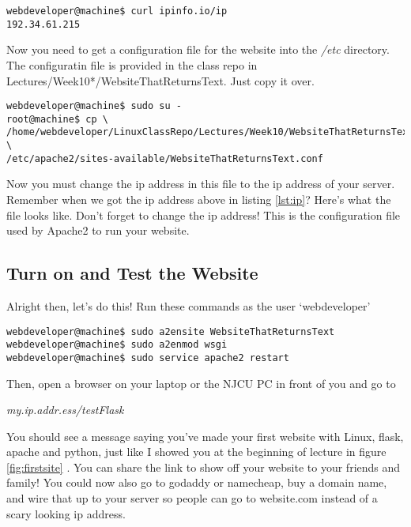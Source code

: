 \documentclass[10pt]{article}
\begin{document}
\begin{lstlisting}[style=term, caption=Run this command to get your server's ip
address., label=lst:ip]
webdeveloper@machine$ curl ipinfo.io/ip
192.34.61.215
\end{lstlisting}

Now you need to get a configuration file for the website into the \textit{/etc}
directory. The configuratin file is provided in the class repo in
Lectures/Week10*/WebsiteThatReturnsText. Just copy it over.

\begin{lstlisting}[style=term, caption=Get the configuration file]
webdeveloper@machine$ sudo su -
root@machine$ cp \
/home/webdeveloper/LinuxClassRepo/Lectures/Week10/WebsiteThatReturnsText/WebsiteThatReturnsText.conf \
/etc/apache2/sites-available/WebsiteThatReturnsText.conf
\end{lstlisting}

Now you must change the ip address in this file to the ip address of your
server. Remember when we got the ip address above in listing \ref{lst:ip}?
Here's what the file looks like. Don't forget to change the ip address! This is
the configuration file used by Apache2 to run your website.



\subsection{Turn on and Test the Website}
Alright then, let's do this! Run these commands as the user `webdeveloper'
\begin{lstlisting}[style=term]
webdeveloper@machine$ sudo a2ensite WebsiteThatReturnsText 
webdeveloper@machine$ sudo a2enmod wsgi
webdeveloper@machine$ sudo service apache2 restart
\end{lstlisting}

Then, open a browser on your laptop or the NJCU PC in front of you and go to 

\begin{center}
\textit{my.ip.addr.ess/testFlask}
\end{center}

You should see a message saying you've made your first website with Linux,
flask, apache and python, just like I showed you at the beginning of lecture in
figure \ref{fig:firstsite} . You can share the link to show off your website to your friends and family! You could now also go to godaddy or namecheap, buy a domain name, and wire that up to your server so people can go to website.com instead of a scary looking ip address.
\end{document}
